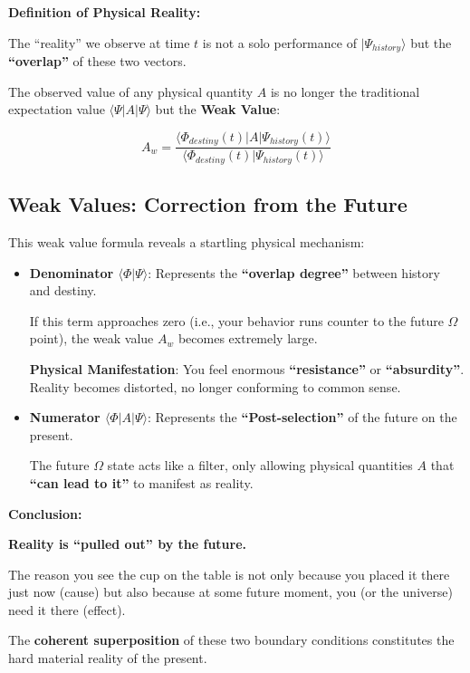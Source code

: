 \textbf{Definition of Physical Reality:}

The ``reality'' we observe at time $t$ is not a solo performance of $|\Psi_{history}\rangle$ but the \textbf{``overlap''} of these two vectors.

The observed value of any physical quantity $A$ is no longer the traditional expectation value $\langle \Psi | A | \Psi \rangle$ but the \textbf{Weak Value}:

\[A_w = \frac{\langle \Phi_{destiny}(t) | A | \Psi_{history}(t) \rangle}{\langle \Phi_{destiny}(t) | \Psi_{history}(t) \rangle}\]

\subsection{Weak Values: Correction from the Future}

This weak value formula reveals a startling physical mechanism:

\begin{itemize}
\item \textbf{Denominator $\langle \Phi | \Psi \rangle$}: Represents the \textbf{``overlap degree''} between history and destiny.

If this term approaches zero (i.e., your behavior runs counter to the future $\Omega$ point), the weak value $A_w$ becomes extremely large.

\textbf{Physical Manifestation}: You feel enormous \textbf{``resistance''} or \textbf{``absurdity''}. Reality becomes distorted, no longer conforming to common sense.

\item \textbf{Numerator $\langle \Phi | A | \Psi \rangle$}: Represents the \textbf{``Post-selection''} of the future on the present.

The future $\Omega$ state acts like a filter, only allowing physical quantities $A$ that \textbf{``can lead to it''} to manifest as reality.
\end{itemize}

\textbf{Conclusion:}

\textbf{Reality is ``pulled out'' by the future.}

The reason you see the cup on the table is not only because you placed it there just now (cause) but also because at some future moment, you (or the universe) need it there (effect).

The \textbf{coherent superposition} of these two boundary conditions constitutes the hard material reality of the present.

